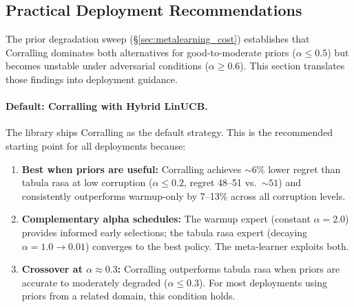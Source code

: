 
\subsection{Practical Deployment Recommendations}
\label{sec:practical}

The prior degradation sweep (\S\ref{sec:metalearning_cost}) establishes
that Corralling dominates both alternatives for good-to-moderate priors
($\alpha \leq 0.5$) but becomes unstable under adversarial conditions
($\alpha \geq 0.6$).
This section translates those findings into deployment guidance.

\paragraph{Default: Corralling with Hybrid LinUCB.}
The library ships Corralling as the default strategy.  This is the
recommended starting point for all deployments because:

\begin{enumerate}[nosep]
    \item \textbf{Best when priors are useful:}
    Corralling achieves ${\sim}6\%$ lower regret than tabula rasa at low
    corruption ($\alpha \leq 0.2$, regret 48--51 vs.\ ${\sim}51$) and
    consistently outperforms warmup-only by 7--13\% across all corruption
    levels.
    \item \textbf{Complementary alpha schedules:}
    The warmup expert (constant $\alpha{=}2.0$) provides informed early
    selections; the tabula rasa expert (decaying $\alpha{=}1.0 \to 0.01$)
    converges to the best policy.  The meta-learner exploits both.
    \item \textbf{Crossover at $\alpha{\approx}0.3$:}
    Corralling outperforms tabula rasa when priors are accurate to
    moderately degraded ($\alpha \leq 0.3$).  For most deployments using
    priors from a related domain, this condition holds.
\end{enumerate}

